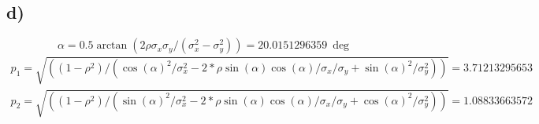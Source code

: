 \subsection{d)}
\begin{equation*}
\alpha = 0.5\arctan(2\rho\sigma_x\sigma_y/(\sigma_x^ 2-\sigma_y^ 2)) = \SI{20.0151296359}{\deg}
\end{equation*}
\begin{align*}
p_1 = \sqrt{((1-\rho^2)/(\cos(\alpha)^2/\sigma_x^2-2*\rho\sin(\alpha)\cos(\alpha)/\sigma_x/\sigma_y+\sin(\alpha)^2/\sigma_y^2))} = \SI{3.71213295653}{}\\
p_2 = \sqrt{((1-\rho^2)/(\sin(\alpha)^2/\sigma_x^2-2*\rho\sin(\alpha)\cos(\alpha)/\sigma_x/\sigma_y+\cos(\alpha)^2/\sigma_y^2))} = \SI{1.08833663572}{}
\end{align*}
